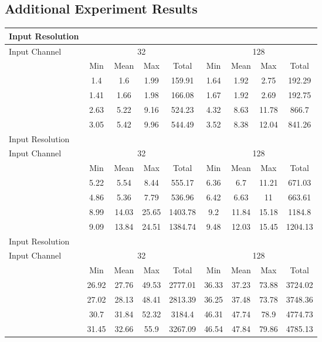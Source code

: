 \documentclass[10pt,twocolumn,letterpaper]{article}
\begin{document}
\subsection*{Additional Experiment Results}
\label{latency}

\begin{table}[ht]
\tiny
  \begin{center}

   \begin{tabular}{l| cccc | cccc}
    \hline
    Input Resolution & \multicolumn{8}{c}{} \\
      \hline
    Input Channel & \multicolumn{4}{c|}{32}        & \multicolumn{4}{c}{128} \\
          & Min  &  Mean & Max   & Total & Min  &  Mean & Max   & Total \\
          \hline \hline
     & 1.4   & 1.6   & 1.99  & 159.91 & 1.64  & 1.92  & 2.75  & 192.29 \\
      & 1.41  & 1.66  & 1.98  & 166.08 & 1.67  & 1.92  & 2.69  & 192.75 \\
      & 2.63  & 5.22  & 9.16  & 524.23 & 4.32  & 8.63  & 11.78 & 866.7 \\
      & 3.05  & 5.42  & 9.96  & 544.49 & 3.52  & 8.38  & 12.04 & 841.26 \\
    \hline
    Input Resolution & \multicolumn{8}{c}{} \\
      \hline
    Input Channel & \multicolumn{4}{c|}{32}        & \multicolumn{4}{c}{128} \\
         & Min  &  Mean & Max   & Total & Min  &  Mean & Max   & Total \\
           \hline \hline
      & 5.22  & 5.54  & 8.44  & 555.17 & 6.36  & 6.7   & 11.21 & 671.03 \\
      & 4.86  & 5.36  & 7.79  & 536.96 & 6.42  & 6.63  & 11    & 663.61 \\
      & 8.99  & 14.03 & 25.65 & 1403.78 & 9.2   & 11.84 & 15.18 & 1184.8 \\
      & 9.09  & 13.84 & 24.51 & 1384.74 & 9.48  & 12.03 & 15.45 & 1204.13 \\
      \hline
    Input Resolution & \multicolumn{8}{c}{} \\
      \hline
    Input Channel & \multicolumn{4}{c|}{32}        & \multicolumn{4}{c}{128} \\
          & Min  &  Mean & Max   & Total & Min  &  Mean & Max   & Total\\
           \hline \hline
      & 26.92 & 27.76 & 49.53 & 2777.01 & 36.33 & 37.23 & 73.88 & 3724.02 \\
      & 27.02 & 28.13 & 48.41 & 2813.39 & 36.25 & 37.48 & 73.78 & 3748.36 \\
      & 30.7  & 31.84 & 52.32 & 3184.4 & 46.31 & 47.74 & 78.9  & 4774.73 \\
      & 31.45 & 32.66 & 55.9  & 3267.09 & 46.54 & 47.84 & 79.86 & 4785.13 \\
    \hline
    \end{tabular}\end{center}
 

\end{table}
\end{document}
